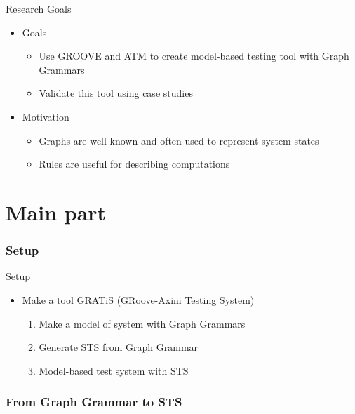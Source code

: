 \documentclass{FMTslides}
\begin{document}
\begin{frame}{Research Goals}
\begin{itemize}
  \item Goals
  \begin{itemize}
    \item Use GROOVE and ATM to create model-based testing tool with Graph Grammars
    \item Validate this tool using case studies
  \end{itemize}
  \item Motivation
  \begin{itemize}
    \item Graphs are well-known and often used to represent system states
    \item Rules are useful for describing computations
  \end{itemize}
\end{itemize}
\end{frame}

\part{Main part}


\makecontentsslide

\section[Setup]{Setup}

\begin{frame}{Setup}
\begin{itemize}
  \item Make a tool GRATiS (GRoove-Axini Testing System)
  \begin{enumerate}
    \item Make a model of system with Graph Grammars
    \item Generate STS from Graph Grammar
    \item Model-based test system with STS
  \end{enumerate}
\end{itemize}
\end{frame}

\section[GG2STS]{From Graph Grammar to STS}
\end{document}
